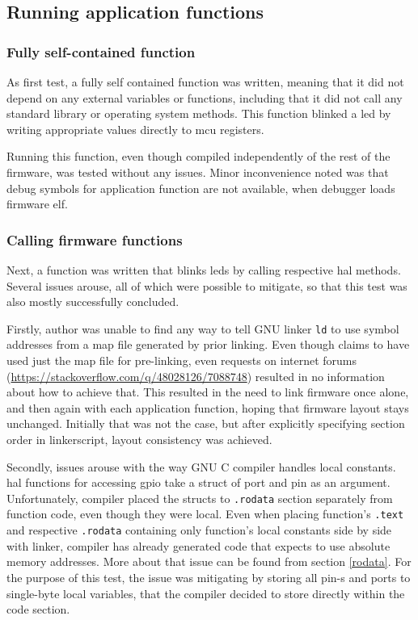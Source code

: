 \subsection{Running application functions}

\subsubsection{Fully self-contained function}

As first test, a fully self contained function was written, meaning that it did not depend on any external variables or functions, including that it did not call any standard library or operating system methods. This function blinked a \gls{led} by writing appropriate values directly to \gls{mcu} registers.

Running this function, even though compiled independently of the rest of the firmware, was tested without any issues. Minor inconvenience noted was that debug symbols for application function are not available, when debugger loads firmware elf.

\subsubsection{Calling firmware functions}

Next, a function was written that blinks \glspl{led} by calling respective \gls{hal} methods. Several issues arouse, all of which were possible to mitigate, so that this test was also mostly successfully concluded.

Firstly, author was unable to find any way to tell GNU linker \texttt{ld} to use symbol addresses from a map file generated by prior linking. Even though \textcite{Dunkels2006} claims to have used just the map file for pre-linking, even requests on internet forums (\url{https://stackoverflow.com/q/48028126/7088748}) resulted in no information about how to achieve that. This resulted in the need to link firmware once alone, and then again with each application function, hoping that firmware layout stays unchanged. Initially that was not the case, but after explicitly specifying section order in linkerscript, layout consistency was achieved.

Secondly, issues arouse with the way GNU C compiler handles local constants. \Gls{hal} functions for accessing \gls{gpio} take a struct of port and pin as an argument. Unfortunately, compiler placed the structs to \texttt{.rodata} section separately from function code, even though they were local. Even when placing function's \texttt{.text} and respective \texttt{.rodata} containing only function's local constants side by side with linker, compiler has already generated code that expects to use absolute memory addresses. More about that issue can be found from section \ref{rodata}. For the purpose of this test, the issue was mitigating by storing all pin-s and ports to single-byte local variables, that the compiler decided to store directly within the code section.


